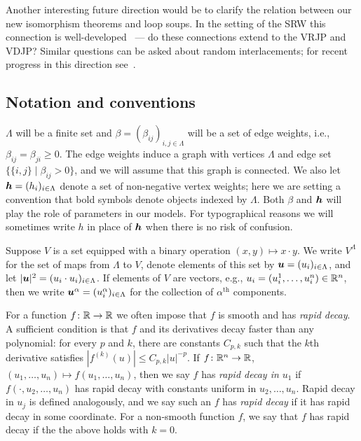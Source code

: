 \documentclass[11pt,a4paper]{article}
\begin{document}
Another interesting future direction would be to clarify the relation
between our new isomorphism theorems and loop soups. In the setting of the
SRW this connection is well-developed~\cite{MR2932978,MR2250510} ---
do these connections extend to the VRJP and VDJP? Similar
questions can be asked about random interlacements; for recent
  progress in this direction see~\cite{1903.07910}.

\subsection{Notation and conventions}
\label{sec:NC}


$\Lambda$ will be a finite set and
$\beta = (\beta_{ij})_{i,j\in\Lambda}$ will be a set of edge weights,
i.e., $\beta_{ij}=\beta_{ji}\geq 0$.  The edge weights induce a graph
with vertices $\Lambda$ and edge set $\{\{i,j\} \mid \beta_{ij}>0\}$,
and we will assume that this graph is connected. We also let
$\boldsymbol{h} = (h_{i})_{i\in\Lambda}$ denote a set of non-negative vertex
weights; here we are setting a convention that bold symbols denote
objects indexed by $\Lambda$. Both $\beta$ and $\boldsymbol{h}$ will play the
role of parameters in our models.  For typographical reasons we will
sometimes write $h$ in place of $\boldsymbol{h}$ when there is no risk of confusion.


Suppose $V$ is a set equipped with a binary operation $(x,y)\mapsto x\cdot y$.
We write $V^{\Lambda}$ for the set of
maps from $\Lambda$ to $V$, denote elements of this set by
$\boldsymbol{u}=(u_{i})_{i\in\Lambda}$, and let $|\boldsymbol{u}|^{2} = (u_{i}\cdot u_{i})_{i\in\Lambda}$.
If elements of $V$ are vectors, e.g.,
$u_{i}=(u_{i}^{1},\dots, u_{i}^{n})\in\mathbb{R}^{n}$, then we write
$\boldsymbol{u}^{\alpha} = (u_{i}^{\alpha})_{i\in\Lambda}$ for the collection
of $\alpha^{\text{th}}$ components.

For a function $f\colon \mathbb{R} \to \mathbb{R}$ we often impose that $f$ is smooth
and has \emph{rapid decay}.  A sufficient condition is that $f$ and
its derivatives decay faster than any polynomial: for every $p$ and
$k$, there are constants $C_{p,k}$ such that the $k$th derivative
satisfies $|f^{(k)}(u)|\leq C_{p,k}|u|^{-p}$. If
$f\colon \mathbb{R}^{n}\to \mathbb{R}$,
$(u_{1},\dots, u_{n})\mapsto f(u_{1},\dots, u_{n})$, then we say $f$
has \emph{rapid decay in $u_{1}$} if $f(\cdot,u_{2},\dots, u_{n})$ has
rapid decay with constants uniform in $u_{2},\dots, u_{n}$. Rapid
decay in $u_{j}$ is defined analogously, and we say such an $f$ has
\emph{rapid decay} if it has rapid decay in some coordinate.  For a
non-smooth function $f$, we say that $f$ has rapid decay if the the
above holds with $k=0$.
\end{document}
